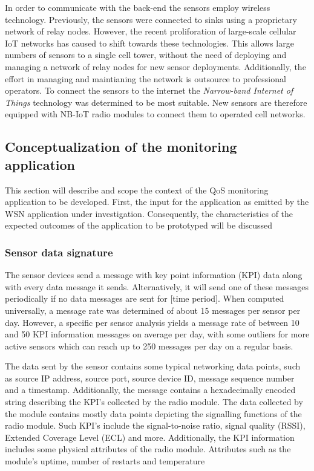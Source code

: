 In order to communicate with the back-end the sensors employ wireless technology. Previously, the sensors were connected to sinks using a proprietary network of relay nodes. However, the recent proliforation of large-scale cellular IoT networks has caused \nedap to shift towards these technologies. This allows large numbers of sensors to a single cell tower, without the need of deploying and managing a network of relay nodes for new sensor deployments. Additionally, the effort in managing and maintianing the network is outsource to professional operators. To connect the sensors to the internet the \emph{Narrow-band Internet of Things} technology was determined to be most suitable. New \sensit sensors are therefore equipped with \ublox \cite{web:ublox} NB-IoT radio modules to connect them to operated cell networks.

\subsection{Conceptualization of the monitoring application}
This section will describe and scope the context of the QoS monitoring application to be developed. First, the input for the application as  emitted by the WSN application under investigation. Consequently, the characteristics of the expected outcomes of the application to be prototyped will be discussed

\subsubsection{Sensor data signature}
The sensor devices send a message with key point information (KPI) data along with every data message it sends. Alternatively, it will send one of these messages periodically if no data messages are sent for [time period]. When computed universally, a message rate was determined of about 15 messages per sensor per day. However, a specific per sensor analysis yields a message rate of between 10 and 50 KPI information messages on average per day, with some outliers for more active sensors which can reach up to 250 messages per day on a regular basis.

The data sent by the sensor contains some typical networking data points, such as source IP address, source port, source device ID, message sequence number and a timestamp. Additionally, the message contains a hexadecimally encoded string describing the KPI's collected by the \ublox radio module. The data collected by the \ublox module contains mostly data points depicting the signalling functions of the radio module. Such KPI's include the signal-to-noise ratio, signal quality (RSSI), Extended Coverage Level (ECL) and more. Additionally, the KPI information includes some physical attributes of the radio module. Attributes such as the module's uptime, number of restarts and temperature

